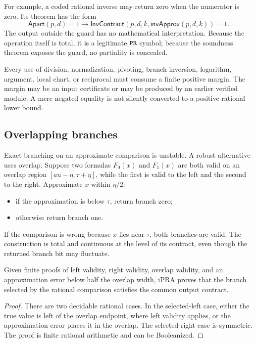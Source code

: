 For example, a coded rational inverse may return zero when the numerator is
zero.  Its theorem has the form
\[
 \mathsf{Apart}(p,d)=1\to
 \mathsf{InvContract}(p,d,k,\mathsf{invApprox}(p,d,k))=1.
\]
The output outside the guard has no mathematical interpretation.  Because the
operation itself is total, it is a legitimate \(\texttt{PR}\) symbol; because the
soundness theorem exposes the guard, no partiality is concealed.

\begin{principle}
Every use of division, normalization, pivoting, branch inversion, logarithm,
argument, local chart, or reciprocal must consume a finite positive margin.
The margin may be an input certificate or may be produced by an earlier
verified module.  A mere negated equality is not silently converted to a
positive rational lower bound.
\end{principle}

\subsection{Overlapping branches}

Exact branching on an approximate comparison is unstable.  A robust
alternative uses overlap.  Suppose two formulas \(F_0(x)\) and \(F_1(x)\) are
both valid on an overlap region
\([	au-\eta,\tau+\eta]\), while the first is valid to the left and the second
to the right.  Approximate \(x\) within \(\eta/2\):

\begin{itemize}
\item if the approximation is below \(\tau\), return branch zero;
\item otherwise return branch one.
\end{itemize}

If the comparison is wrong because \(x\) lies near \(\tau\), both branches are
valid.  The construction is total and continuous at the level of its
contract, even though the returned branch bit may fluctuate.

\begin{theorem}
\label{thm:overlapping-branch}
Given finite proofs of left validity, right validity, overlap validity, and an
approximation error below half the overlap width, iPRA proves that the branch
selected by the rational comparison satisfies the common output contract.
\end{theorem}

\begin{proof}
There are two decidable rational cases.  In the selected-left case, either the
true value is left of the overlap endpoint, where left validity applies, or
the approximation error places it in the overlap.  The selected-right case is
symmetric.  The proof is finite rational arithmetic and can be Booleanized.
\end{proof}


